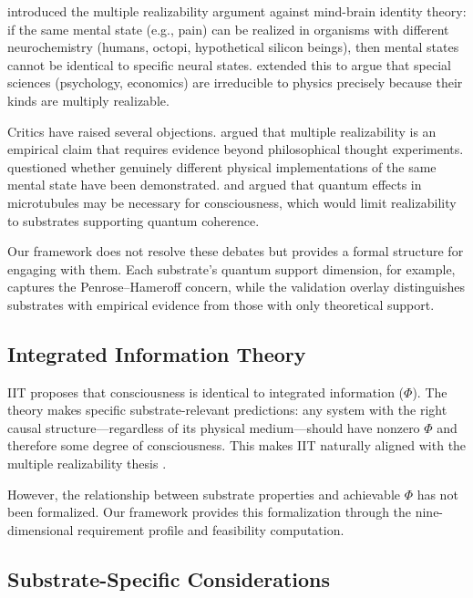 \documentclass[12pt,a4paper]{article}
\begin{document}
\citet{putnam1967psychological} introduced the multiple realizability argument against mind-brain identity theory: if the same mental state (e.g., pain) can be realized in organisms with different neurochemistry (humans, octopi, hypothetical silicon beings), then mental states cannot be identical to specific neural states. \citet{fodor1974special} extended this to argue that special sciences (psychology, economics) are irreducible to physics precisely because their kinds are multiply realizable.

Critics have raised several objections. \citet{bechtel1999multiple} argued that multiple realizability is an empirical claim that requires evidence beyond philosophical thought experiments. \citet{shapiro2000multiple} questioned whether genuinely different physical implementations of the same mental state have been demonstrated. \citet{penrose1994shadows} and \citet{hameroff1996orchestrated} argued that quantum effects in microtubules may be necessary for consciousness, which would limit realizability to substrates supporting quantum coherence.

Our framework does not resolve these debates but provides a formal structure for engaging with them. Each substrate's quantum support dimension, for example, captures the Penrose--Hameroff concern, while the validation overlay distinguishes substrates with empirical evidence from those with only theoretical support.

\subsection{Integrated Information Theory}

IIT \citep{tononi2004information, oizumi2014phenomenology} proposes that consciousness is identical to integrated information ($\Phi$). The theory makes specific substrate-relevant predictions: any system with the right causal structure---regardless of its physical medium---should have nonzero $\Phi$ and therefore some degree of consciousness. This makes IIT naturally aligned with the multiple realizability thesis \citep{tononi2015integrated}.

However, the relationship between substrate properties and achievable $\Phi$ has not been formalized. Our framework provides this formalization through the nine-dimensional requirement profile and feasibility computation.

\subsection{Substrate-Specific Considerations}
\end{document}
